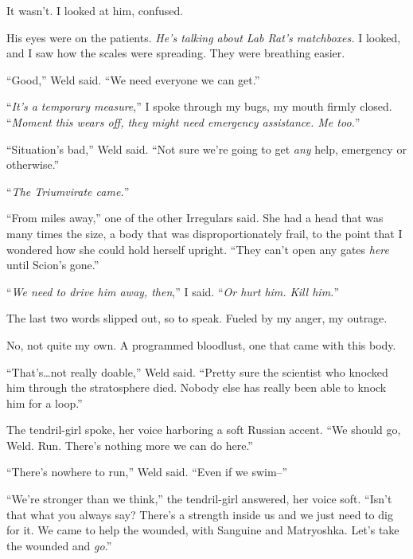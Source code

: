 It wasn't.  I looked at him, confused.



His eyes were on the patients.  \emph{He's talking about Lab Rat's matchboxes.  }I looked, and I saw how the scales were spreading.  They were breathing easier.



``Good,'' Weld said.  ``We need everyone we can get.''



``\emph{It's a temporary measure},'' I spoke through my bugs, my mouth firmly closed.  ``\emph{Moment this wears off, they might need emergency assistance.  Me too.}''



``Situation's bad,'' Weld said.  ``Not sure we're going to get \emph{any} help, emergency or otherwise.''



``\emph{The Triumvirate came.}''



``From miles away,'' one of the other Irregulars said.  She had a head that was many times the size, a body that was disproportionately frail, to the point that I wondered how she could hold herself upright.  ``They can't open any gates \emph{here} until Scion's gone.''



``\emph{We need to drive him away, then},'' I said.  ``\emph{Or hurt him.  Kill him.}''



The last two words slipped out, so to speak.  Fueled by my anger, my outrage.



No, not quite my own.  A programmed bloodlust, one that came with this body.



``That's\ldots not really doable,'' Weld said.  ``Pretty sure the scientist who knocked him through the stratosphere died.  Nobody else has really been able to knock him for a loop.''



The tendril-girl spoke, her voice harboring a soft Russian accent.  ``We should go, Weld.  Run.  There's nothing more we can do here.''



``There's nowhere to run,'' Weld said.  ``Even if we swim--''



``We're stronger than we think,'' the tendril-girl answered, her voice soft.  ``Isn't that what you always say?  There's a strength inside us and we just need to dig for it.  We came to help the wounded, with Sanguine and Matryoshka.  Let's take the wounded and \emph{go}.''




